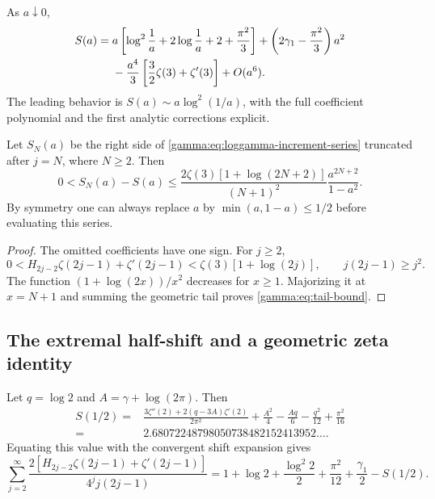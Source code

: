 \begin{corollary}
\label{gamma:cor:sharp-cusp}
As $a\downarrow0$,
\begin{align}
 S(a)={}&a\left[\log^2\frac1a+2\log\frac1a+2+\frac{\pi^2}{3}\right]
       +\left(2\gamma_1-\frac{\pi^2}{3}\right)a^2\notag\\
 &-\frac{a^4}{3}\left[\frac32\zeta(3)+\zeta'(3)\right]+O(a^6).
 \label{gamma:eq:sharp-cusp}
\end{align}
The leading behavior is $S(a)\sim a\log^2(1/a)$, with the full
coefficient polynomial and the first analytic corrections explicit.
\end{corollary}

\begin{corollary}
\label{gamma:cor:tail}
Let $S_N(a)$ be the right side of
\eqref{gamma:eq:loggamma-increment-series} truncated after $j=N$, where
$N\ge2$. Then
\begin{equation}
 0<S_N(a)-S(a)
 \le\frac{2\zeta(3)[1+\log(2N+2)]}{(N+1)^2}
             \frac{a^{2N+2}}{1-a^2}.
 \label{gamma:eq:tail-bound}
\end{equation}
By symmetry one can always replace $a$ by $\min(a,1-a)\le1/2$ before
evaluating this series.
\end{corollary}

\begin{proof}
The omitted coefficients have one sign. For $j\ge2$,
\[
 0<H_{2j-2}\zeta(2j-1)+\zeta'(2j-1)
    <\zeta(3)[1+\log(2j)],
 \qquad j(2j-1)\ge j^2.
\]
The function $(1+\log(2x))/x^2$ decreases for $x\ge1$.
Majorizing it at $x=N+1$ and summing the geometric tail proves
\eqref{gamma:eq:tail-bound}.
\end{proof}

\subsection{The extremal half-shift and a geometric zeta identity}

\begin{corollary}
\label{gamma:cor:half-maximum}
Let $q=\log2$ and $A=\gamma+\log(2\pi)$. Then
\begin{equation}
 \begin{split}
 S(1/2)={}&\frac{3\zeta''(2)+2(q-3A)\zeta'(2)}{2\pi^2}
       +\frac{A^2}{4}-\frac{Aq}{6}-\frac{q^2}{12}+\frac{\pi^2}{16}\\
 ={}&2.68072248798050738482152413952\ldots .
 \end{split}
 \label{gamma:eq:half-maximum}
\end{equation}
Equating this value with the convergent shift expansion gives
\begin{equation}
 \sum_{j=2}^{\infty}\frac{2[H_{2j-2}\zeta(2j-1)+\zeta'(2j-1)]}
                  {4^j j(2j-1)}
 =1+\log2+\frac{\log^2 2}{2}+\frac{\pi^2}{12}
              +\frac{\gamma_1}{2}-S(1/2).
 \label{gamma:eq:dyadic-series}
\end{equation}
\end{corollary}

